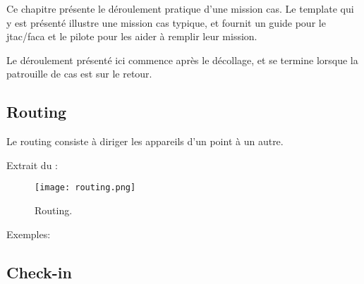 
\begin{e1}
	\item
	Ce chapitre présente le déroulement pratique d’une mission \acrshort{cas}. Le template qui y est présenté illustre une mission \acrshort{cas} typique, et fournit un guide pour le \acrshort{jtac}/\acrshort{faca} et le pilote pour les aider à remplir leur mission.
	\item Le déroulement présenté ici commence après le décollage, et se termine lorsque la patrouille de \acrshort{cas} est sur le retour.
\end{e1}

\subsection{Routing}
\begin{e1}
	\item Le routing consiste à diriger les appareils d’un point à un autre.
	\item Extrait du \jp:\\
	\begin{figure}[H]
		\texttt{[image: routing.png]}
		\caption{Routing.}
		\label{fig:routing}
	\end{figure}
	\item Exemples:\\
\end{e1}

\subsection{Check-in}


